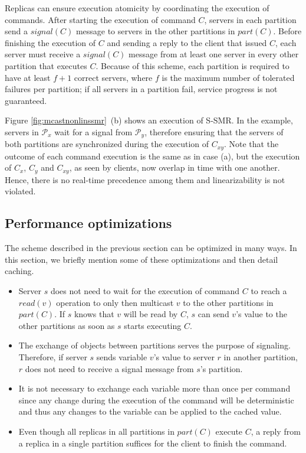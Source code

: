 \documentclass[11pt]{article}
\newcommand{\ppm}{\mathcal{P}}
\begin{document}
Replicas can ensure execution atomicity by coordinating the execution of commands.
After starting the execution of command $C$, servers in each partition send a $signal(C)$ message to servers in the other partitions in $part(C)$.
Before finishing the execution of $C$ and sending a reply to the client that issued $C$, each server must receive a $signal(C)$ message from at least one server in every other partition that executes $C$.
Because of this scheme, each partition is required to have at least $f+1$ correct servers, where $f$ is the maximum number of tolerated failures per partition; if all servers in a partition fail, service progress is not guaranteed.

Figure \ref{fig:mcastnonlinssmr}~(b) shows an execution of S-SMR.
In the example, servers in $\ppm_x$ wait for a signal from $\ppm_y$,
therefore ensuring that the servers of both partitions are synchronized during the execution of $C_{xy}$.
Note that the outcome of each command execution is the same as in case (a), but the execution of $C_x$, $C_y$ and $C_{xy}$, as seen by clients, now overlap in time with one another.
Hence, there is no real-time precedence among them and linearizability is not violated.




\subsection{Performance optimizations}
\label{sec:optm}

The scheme described in the previous section can be optimized in many ways.
In this section, we briefly mention some of these optimizations and then detail caching.
\begin{itemize}
\item Server $s$ does not need to wait for the execution of command $C$ to reach a $read(v)$ operation to only then multicast $v$ to the other partitions in $part(C)$. If $s$ knows that $v$ will be read by $C$, $s$ can send $v$'s value to the other partitions as soon as $s$ starts executing $C$.
\item The exchange of objects between partitions serves the purpose of signaling. Therefore, if server $s$ sends variable $v$'s value to server $r$ in another partition, $r$ does not need to receive a signal message from $s$'s partition.
\item It is not necessary to exchange each variable more than once per command since any change during the execution of the command will be deterministic and thus any changes to the variable can be applied to the cached value.
\item Even though all replicas in all partitions in $part(C)$ execute $C$, a reply from a replica in a single partition suffices for the client to finish the command.
\end{itemize}
\end{document}
